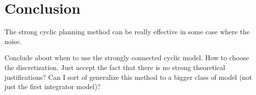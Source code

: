 
\section{Conclusion}
The strong cyclic planning method can be really effective in some case where the noise.

Conclude about when to use the strongly connected cyclic model.
How to choose the discretization.
Just accept the fact that there is no strong theoretical justifications?
Can I sort of generalize this method to a bigger class of model (not just the first integrator model)?

